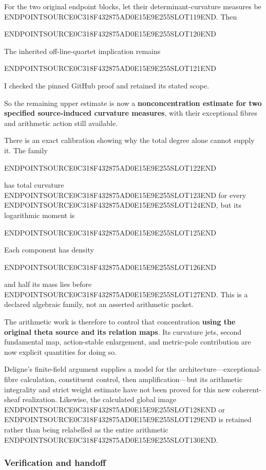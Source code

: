 For the two original endpoint blocks, let their determinant-curvature measures be ENDPOINTSOURCE0C318F432875AD0E15E9E255SLOT119END. Then

ENDPOINTSOURCE0C318F432875AD0E15E9E255SLOT120END

The inherited off-line-quartet implication remains

ENDPOINTSOURCE0C318F432875AD0E15E9E255SLOT121END

I checked the pinned GitHub proof and retained its stated scope.

So the remaining upper estimate is now a \textbf{nonconcentration estimate for two specified source-induced curvature measures}, with their exceptional fibres and arithmetic action still available.

There is an exact calibration showing why the total degree alone cannot supply it. The family

ENDPOINTSOURCE0C318F432875AD0E15E9E255SLOT122END

has total curvature ENDPOINTSOURCE0C318F432875AD0E15E9E255SLOT123END for every ENDPOINTSOURCE0C318F432875AD0E15E9E255SLOT124END, but its logarithmic moment is

ENDPOINTSOURCE0C318F432875AD0E15E9E255SLOT125END

Each component has density

ENDPOINTSOURCE0C318F432875AD0E15E9E255SLOT126END

and half its mass lies before ENDPOINTSOURCE0C318F432875AD0E15E9E255SLOT127END. This is a declared algebraic family, not an asserted arithmetic packet.

The arithmetic work is therefore to control that concentration \textbf{using the original theta source and its relation maps}. Its curvature jets, second fundamental map, action-stable enlargement, and metric-pole contribution are now explicit quantities for doing so.

Deligne's finite-field argument supplies a model for the architecture---exceptional-fibre calculation, constituent control, then amplification---but its arithmetic integrality and strict weight estimate have not been proved for this new coherent-sheaf realization. Likewise, the calculated global image ENDPOINTSOURCE0C318F432875AD0E15E9E255SLOT128END or ENDPOINTSOURCE0C318F432875AD0E15E9E255SLOT129END is retained rather than being relabelled as the entire arithmetic ENDPOINTSOURCE0C318F432875AD0E15E9E255SLOT130END.

\subsubsection{Verification and handoff}\label{endpoint-curvature_original--verification-and-handoff}

